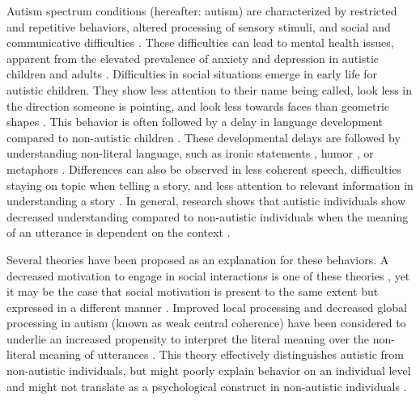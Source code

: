 Autism spectrum conditions (hereafter: autism) are characterized by restricted and repetitive behaviors, altered processing of sensory stimuli, and social and communicative difficulties \citep{apa2013}. These difficulties can lead to mental health issues, apparent from the elevated prevalence of anxiety and depression in autistic children and adults \citep{hollocks2019,lai2019,vasa2020}. Difficulties in social situations emerge in early life for autistic children. They show less attention to their name being called, look less in the direction someone is pointing, and look less towards faces than geometric shapes \citep{goldberg2005,osterling2002,pierce2011}. This behavior is often followed by a delay in language development compared to non-autistic children \citep{kim2014}. These developmental delays are followed by understanding non-literal language, such as ironic statements \citep{wang2006,deliens2018}, humor \citep{ozonoff1996}, or metaphors \citep{rundblad2010}. Differences can also be observed in less coherent speech, difficulties staying on topic when telling a story, and less attention to relevant information in understanding a story \citep{diehl2006,volden2002,yingsng2018}. In general, research shows that autistic individuals show decreased understanding compared to non-autistic individuals when the meaning of an utterance is dependent on the context \citep{angeleri2016,happe1997,loukusa2007,wadge2019}. 

Several theories have been proposed as an explanation for these behaviors. A decreased motivation to engage in social interactions is one of these theories \citep{chevallier2012}, yet it may be the case that social motivation is present to the same extent but expressed in a different manner \citep{escalona2002}. Improved local processing and decreased global processing in autism (known as weak central coherence) have been considered to underlie an increased propensity to interpret the literal meaning over the non-literal meaning of utterances \citep{happe1997}. This theory effectively distinguishes autistic from non-autistic individuals, but might poorly explain behavior on an individual level \citep{pellicano2006} and might not translate as a psychological construct in non-autistic individuals \citep{pellicano2005}. 

